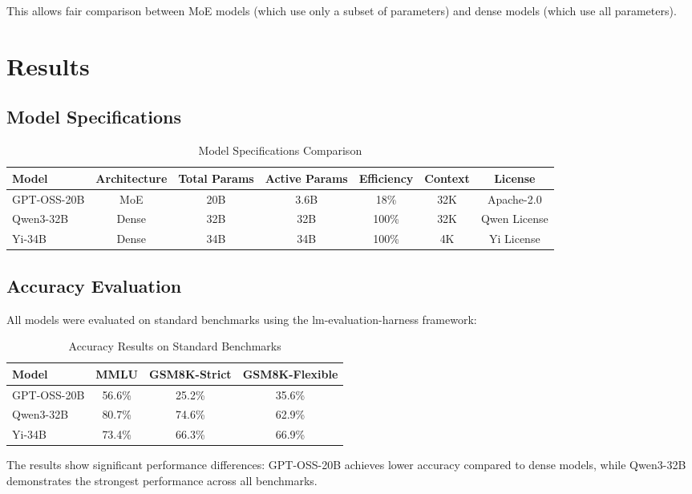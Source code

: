 \documentclass[11pt]{article}
\begin{document}
This allows fair comparison between MoE models (which use only a subset of parameters) and dense models (which use all parameters).

\section{Results}

\subsection{Model Specifications}

\begin{table}[h]
\centering
\caption{Model Specifications Comparison}
\begin{tabular}{lcccccc}
\toprule
Model & Architecture & Total Params & Active Params & Efficiency & Context & License \\
\midrule
GPT-OSS-20B & MoE & 20B & 3.6B & 18\% & 32K & Apache-2.0 \\
Qwen3-32B & Dense & 32B & 32B & 100\% & 32K & Qwen License \\
Yi-34B & Dense & 34B & 34B & 100\% & 4K & Yi License \\
\bottomrule
\end{tabular}
\end{table}

\subsection{Accuracy Evaluation}

All models were evaluated on standard benchmarks using the lm-evaluation-harness framework:

\begin{table}[h]
\centering
\caption{Accuracy Results on Standard Benchmarks}
\begin{tabular}{lccc}
\toprule
Model & MMLU & GSM8K-Strict & GSM8K-Flexible \\
\midrule
GPT-OSS-20B & 56.6\% & 25.2\% & 35.6\% \\
Qwen3-32B & 80.7\% & 74.6\% & 62.9\% \\
Yi-34B & 73.4\% & 66.3\% & 66.9\% \\
\bottomrule
\end{tabular}
\end{table}

The results show significant performance differences: GPT-OSS-20B achieves lower accuracy compared to dense models, while Qwen3-32B demonstrates the strongest performance across all benchmarks.
\end{document}
